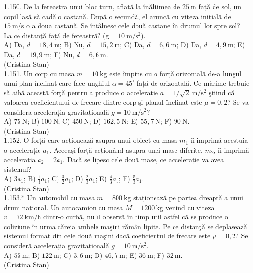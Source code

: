 1.150. De la fereastra unui bloc turn, aflată la înălțimea de $25 \mathrm{~m}$ față de sol, un copil lasă să cadă o castană. După o secundă, el aruncă cu viteza inițială de $15 \mathrm{~m} / \mathrm{s}$ o a doua castană. Se întâlnesc cele două castane în drumul lor spre sol? La ce distanţă față de fereastră? ($\mathrm{g}=10 \mathrm{~m} / \mathrm{s}^{2}$).\\ A) Da, $d=18,4 \mathrm{~m}$; B) Nu, $d=15,2 \mathrm{~m}$; C) Da, $d=6,6 \mathrm{~m}$; D) Da, $d=4,9 \mathrm{~m}$; E) Da, $d=19,9 \mathrm{~m}$; F) Nu, $d=6,6 \mathrm{~m}$.\\ (Cristina Stan)\\

1.151. Un corp cu masa $m=10 \mathrm{~kg}$ este împins cu o forță orizontală de-a lungul unui plan înclinat care face unghiul $\alpha=45^{\circ}$ față de orizontală. Ce mărime trebuie să aibă această forţă pentru a produce o accelerație $a=1 / \sqrt{2} \mathrm{~m} / \mathrm{s}^{2}$ ştiind că valoarea coeficientului de frecare dintre corp şi planul înclinat este $\mu=0,2$? Se va considera accelerația gravitațională $g=10 \mathrm{~m} / \mathrm{s}^{2}$?\\ A) $75 \mathrm{~N}$; B) $100 \mathrm{~N}$; C) $450 \mathrm{~N}$; D) $162,5 \mathrm{~N}$; E) $55,7 \mathrm{~N}$; F) $90 \mathrm{~N}$.\\ (Cristina Stan)\\

1.152. O forță care acționează asupra unui obiect cu masa $m_{1}$ îi imprimă acestuia o accelerație $a_{1}$. Aceeaşi forță acționând asupra unei mase diferite, $m_{2}$, îi imprimă accelerația $a_{2}=2 a_{1}$. Dacă se lipesc cele două mase, ce accelerație va avea sistemul?\\ A) $3 a_{1}$; B) $\frac{1}{3} a_{1}$; C) $\frac{3}{2} a_{1}$; D) $\frac{2}{3} a_{1}$; E) $\frac{4}{3} a_{1}$; F) $\frac{5}{3} a_{1}$.\\ (Cristina Stan)\\

1.153.* Un automobil cu masa $m=800 \mathrm{~kg}$ staționează pe partea dreaptă a unui drum național. Un autocamion cu masa $M=1200 \mathrm{~kg}$ venind cu viteza $v=72 \mathrm{~km} / \mathrm{h}$ dintr-o curbă, nu îl observă în timp util astfel că se produce o coliziune în urma căreia ambele maşini rămân lipite. Pe ce distanţă se deplasează sistemul format din cele două maşini dacă coeficientul de frecare este $\mu=0,2$? Se consideră accelerația gravitațională $g=10 \mathrm{~m} / \mathrm{s}^{2}$.\\ A) $55 \mathrm{~m}$; B) $122 \mathrm{~m}$; C) $3,6 \mathrm{~m}$; D) $46,7 \mathrm{~m}$; E) $36 \mathrm{~m}$; F) $32 \mathrm{~m}$.\\ (Cristina Stan)\\

